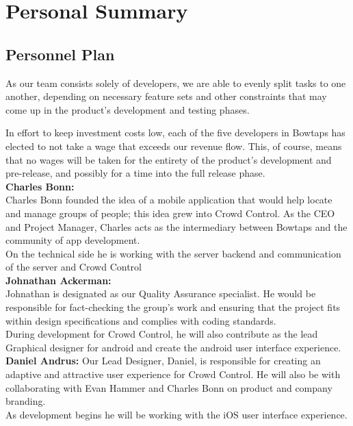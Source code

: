 

\chapter{Personal Summary}

\section{Personnel Plan}

As our team consists solely of developers, we are able to evenly split tasks to one another, depending on necessary feature sets and other constraints that may come up in the product’s development and testing phases.

In effort to keep investment costs low, each of the five developers in Bowtaps has elected to not take a wage that exceeds our revenue flow. This, of course, means that no wages will be taken for the entirety of the product’s development and pre-release, and possibly for a time into the full release phase.\\





\noindent
\textbf{Charles Bonn:}\\ Charles Bonn founded the idea of a mobile application that would help locate and manage groups of people; this idea grew into Crowd Control. As the CEO and Project Manager, Charles acts as the intermediary between Bowtaps and the community of app development. \\
On the technical side he is working with the server backend and communication of the server and Crowd Control \\

\noindent
\textbf{Johnathan Ackerman:}\\ Johnathan is designated as our Quality Assurance specialist. He would be responsible for fact-checking the group’s work and ensuring that the project fits within design specifications and complies with coding standards.\\
 During development for Crowd Control, he will also contribute as the lead Graphical designer for android and create the android user interface experience.\\
 
\noindent
\textbf{Daniel Andrus:} Our Lead Designer, Daniel, is responsible for creating an adaptive and attractive user experience for Crowd Control. He will also be with collaborating with Evan Hammer and Charles Bonn on product and company branding.\\
 As development begins he will be working with the iOS user interface experience.\\
 
